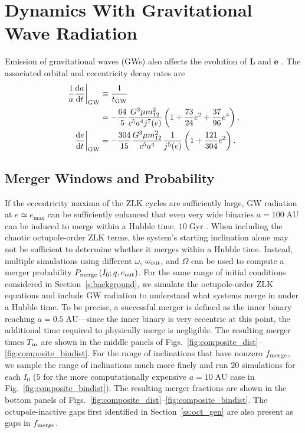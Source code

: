 \documentclass[
        fleqn,
        usenatbib,
    ]{mnras}
\newcommand*{\rd}[2]{\frac{\mathrm{d}#1}{\mathrm{d}#2}}
\newcommand*{\at}[1]{\left.#1\right|}
\newcommand*{\p}[1]{\left(#1\right)}
\newcommand*{\bm}[1]{\mathbf{#1}}
\begin{document}
\section{Dynamics With Gravitational Wave Radiation}\label{s:with_gw}

Emission of gravitational waves (GWs) also affects the evolution of $\bm{L}$ and
$\bm{e}$ \citep{peters1964, LL18}. The associated orbital and eccentricity decay
rates are
\begin{align}
    \at{\frac{1}{a}\rd{a}{t}}_{\rm GW} &\equiv \frac{1}{t_{\rm GW}}\nonumber\\
        &= -\frac{64}{5}\frac{G^3 \mu m_{12}^2}{c^5a^4j^7(e)}
            \p{1 + \frac{73}{24}e^2 + \frac{37}{96}e^4}\label{eq:def_tgw},\\
    \at{\rd{e}{t}}_{\rm GW} &= -\frac{304}{15}\frac{G^3 \mu m_{12}^2}{c^5a^4}
        \frac{1}{j^{5}(e)}\p{1 + \frac{121}{304}e^2}\label{eq:dedt_gw}.
\end{align}

\subsection{Merger Windows and Probability}

If the eccentricity maxima of the ZLK cycles are sufficiently large, GW
radiation at $e \simeq e_{\max}$ can be sufficiently enhanced that even very
wide binaries $a = 100\;\mathrm{AU}$ can be induced to merge within a Hubble
time, $10\;\mathrm{Gyr}$ \citep{LL18, LL19}. When including the chaotic
octupole-order ZLK terms, the system's starting inclination alone may not be
sufficient to determine whether it merges within a Hubble time. Instead,
multiple simulations using different $\omega$, $\omega_{\rm out}$, and $\Omega$
can be used to compute a merger probability $P_{\rm merge}\p{I_{\rm 0}; q,
e_{\rm out}}$. For the same range of initial conditions considered in
Section~\ref{s:background}, we simulate the octupole-order ZLK equations and
include GW radiation to understand what systems merge in under a Hubble time. To
be precise, a successful merger is defined as the inner binary reaching $a =
0.5\;\mathrm{AU}$---since the inner binary is very eccentric at this point, the
additional time required to physically merge is negligible. The resulting merger
times $T_{\rm m}$ are shown in the middle panels of
Figs.~\ref{fig:composite_dist}--\ref{fig:composite_bindist}. For the range of
inclinations that have nonzero $f_{\rm merge}$, we sample the range of
inclinations much more finely and run $20$ simulations for each $I_0$ ($5$ for
the more computationally expensive $a = 10\;\mathrm{AU}$ case in
Fig.~\ref{fig:composite_bindist}). The resulting merger fractions are shown in
the bottom panels of
Figs.~\ref{fig:composite_dist}--\ref{fig:composite_bindist}. The
octupole-inactive gaps first identified in Section~\ref{ss:oct_gen} are also
present as gaps in $f_{\rm merge}$.
\end{document}
